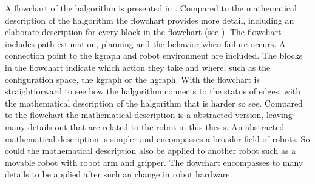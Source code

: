 A flowchart of the \ac{halgorithm} is presented in . Compared to the mathematical description of the \ac{halgorithm} the flowchart provides more detail, including an elaborate description for every block in the flowchart (see ). The flowchart includes path estimation, planning and the behavior when failure occurs. A connection point to the \ac{kgraph} and robot environment are included. The blocks in the flowchart indicate which action they take and where, such as the configuration space, the \ac{kgraph} or the \ac{hgraph}. With the flowchart is straightforward to see how the \ac{halgorithm} connects to the status of edges, with the mathematical description of the \ac{halgorithm} that is harder so see. Compared to the flowchart the mathematical description is a abstracted version, leaving many details out that are related to the robot in this thesis. An abstracted mathematical description is simpler and encompasses a broader field of robots. So could the mathematical description also be applied to another robot such as a movable robot with robot arm and gripper. The flowchart encompasses to many details to be applied after such an change in robot hardware.



